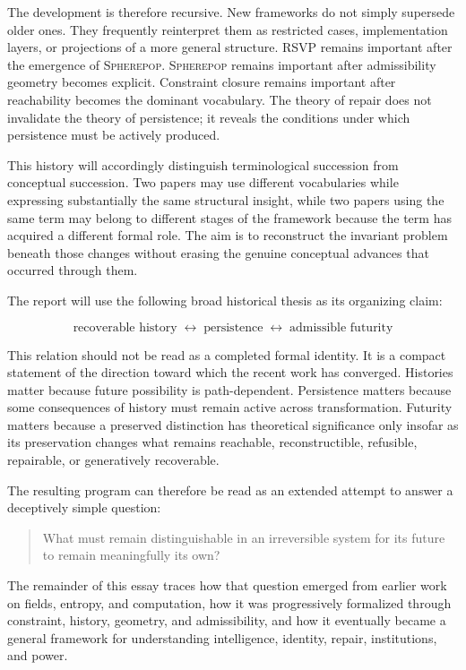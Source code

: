 \documentclass[11pt]{article}
\theoremstyle{remark}
\newcommand{\RSVP}{\textsc{RSVP}}
\newcommand{\Spherepop}{\textsc{Spherepop}}
\begin{document}
The development is therefore recursive. New frameworks do not simply supersede older ones. They frequently reinterpret them as restricted cases, implementation layers, or projections of a more general structure. \RSVP{} remains important after the emergence of \Spherepop{}. \Spherepop{} remains important after admissibility geometry becomes explicit. Constraint closure remains important after reachability becomes the dominant vocabulary. The theory of repair does not invalidate the theory of persistence; it reveals the conditions under which persistence must be actively produced.

This history will accordingly distinguish terminological succession from conceptual succession. Two papers may use different vocabularies while expressing substantially the same structural insight, while two papers using the same term may belong to different stages of the framework because the term has acquired a different formal role. The aim is to reconstruct the invariant problem beneath those changes without erasing the genuine conceptual advances that occurred through them.

The report will use the following broad historical thesis as its organizing claim:

\begin{equation}
\boxed{
\text{recoverable history}
\;\longleftrightarrow\;
\text{persistence}
\;\longleftrightarrow\;
\text{admissible futurity}
}
\end{equation}

This relation should not be read as a completed formal identity. It is a compact statement of the direction toward which the recent work has converged. Histories matter because future possibility is path-dependent. Persistence matters because some consequences of history must remain active across transformation. Futurity matters because a preserved distinction has theoretical significance only insofar as its preservation changes what remains reachable, reconstructible, refusible, repairable, or generatively recoverable.

The resulting program can therefore be read as an extended attempt to answer a deceptively simple question:

\begin{quote}
What must remain distinguishable in an irreversible system for its future to remain meaningfully its own?
\end{quote}

The remainder of this essay traces how that question emerged from earlier work on fields, entropy, and computation, how it was progressively formalized through constraint, history, geometry, and admissibility, and how it eventually became a general framework for understanding intelligence, identity, repair, institutions, and power.
\end{document}
